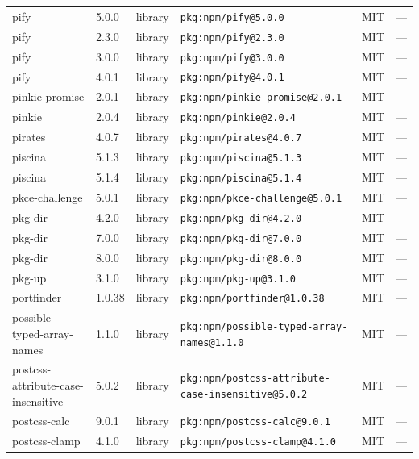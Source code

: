 \documentclass[11pt,a4paper]{article}
\begin{document}
\begin{longtable}{|p{4cm}|p{2cm}|p{1.6cm}|p{5cm}|p{1.5cm}|p{3.5cm}|}
\raggedright pify & 5.0.0 & library & \small\texttt{pkg:npm/pify@5.0.0} & MIT & \small — \\
\raggedright pify & 2.3.0 & library & \small\texttt{pkg:npm/pify@2.3.0} & MIT & \small — \\
\raggedright pify & 3.0.0 & library & \small\texttt{pkg:npm/pify@3.0.0} & MIT & \small — \\
\raggedright pify & 4.0.1 & library & \small\texttt{pkg:npm/pify@4.0.1} & MIT & \small — \\
\raggedright pinkie-promise & 2.0.1 & library & \small\texttt{pkg:npm/pinkie-promise@2.0.1} & MIT & \small — \\
\raggedright pinkie & 2.0.4 & library & \small\texttt{pkg:npm/pinkie@2.0.4} & MIT & \small — \\
\raggedright pirates & 4.0.7 & library & \small\texttt{pkg:npm/pirates@4.0.7} & MIT & \small — \\
\raggedright piscina & 5.1.3 & library & \small\texttt{pkg:npm/piscina@5.1.3} & MIT & \small — \\
\raggedright piscina & 5.1.4 & library & \small\texttt{pkg:npm/piscina@5.1.4} & MIT & \small — \\
\raggedright pkce-challenge & 5.0.1 & library & \small\texttt{pkg:npm/pkce-challenge@5.0.1} & MIT & \small — \\
\raggedright pkg-dir & 4.2.0 & library & \small\texttt{pkg:npm/pkg-dir@4.2.0} & MIT & \small — \\
\raggedright pkg-dir & 7.0.0 & library & \small\texttt{pkg:npm/pkg-dir@7.0.0} & MIT & \small — \\
\raggedright pkg-dir & 8.0.0 & library & \small\texttt{pkg:npm/pkg-dir@8.0.0} & MIT & \small — \\
\raggedright pkg-up & 3.1.0 & library & \small\texttt{pkg:npm/pkg-up@3.1.0} & MIT & \small — \\
\raggedright portfinder & 1.0.38 & library & \small\texttt{pkg:npm/portfinder@1.0.38} & MIT & \small — \\
\raggedright possible-typed-array-names & 1.1.0 & library & \small\texttt{pkg:npm/possible-typed-array-names@1.1.0} & MIT & \small — \\
\raggedright postcss-attribute-case-insensitive & 5.0.2 & library & \small\texttt{pkg:npm/postcss-attribute-case-insensitive@5.0.2} & MIT & \small — \\
\raggedright postcss-calc & 9.0.1 & library & \small\texttt{pkg:npm/postcss-calc@9.0.1} & MIT & \small — \\
\raggedright postcss-clamp & 4.1.0 & library & \small\texttt{pkg:npm/postcss-clamp@4.1.0} & MIT & \small — \\

\end{longtable}
\end{document}

